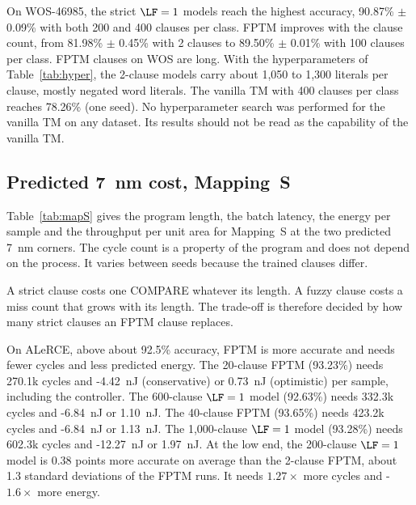 On WOS-46985, the strict $\LF=1$ models reach the highest accuracy, 90.87\% $\pm$ 0.09\% with both 200 and 400 clauses per class.
FPTM improves with the clause count, from 81.98\% $\pm$ 0.45\% with 2 clauses to 89.50\% $\pm$ 0.01\% with 100 clauses per class.
FPTM clauses on WOS are long. With the hyperparameters of Table~\ref{tab:hyper}, the 2-clause models carry about 1,050 to 1,300 literals per clause, mostly negated word literals.
The vanilla TM with 400 clauses per class reaches 78.26\% (one seed).
No hyperparameter search was performed for the vanilla TM on any dataset. Its results should not be read as the capability of the vanilla TM.

\subsection{Predicted 7~nm \gainp{} cost, Mapping~S}
Table~\ref{tab:mapS} gives the program length, the batch latency, the energy per sample and the throughput per unit area for Mapping~S at the two predicted 7~nm corners.
The cycle count is a property of the program and does not depend on the process. It varies between seeds because the trained clauses differ.

\begin{table}
\footnotesize
\setlength{\tabcolsep}{4pt}
\centering
\caption{Mapping~S (sample-stationary) at the predicted 7~nm corners, mean $\pm$ standard deviation over seeds where shown. Rows/col.: CAM rows per logical column. Subarrays: stacked subarrays per logical column. Latency includes refresh. Energy includes dynamic, refresh, gain-cell static and controller energy (M6). It excludes input loading (M4) and model-SRAM leakage (M7). Throughput includes input loading and is given per mm$^2$ of occupied subarrays and model SRAM (M7) of a 256-subarray macro.}
\label{tab:mapS}

\end{table}


A strict clause costs one COMPARE whatever its length.
A fuzzy clause costs a miss count that grows with its length.
The trade-off is therefore decided by how many strict clauses an FPTM clause replaces.

On ALeRCE, above about 92.5\% accuracy, FPTM is more accurate and needs fewer cycles and less predicted energy.
The 20-clause FPTM (93.23\%) needs 270.1k cycles and \hyp{4.42~nJ (conservative) or 0.73~nJ (optimistic)} per sample, including the controller.
The 600-clause $\LF=1$ model (92.63\%) needs 332.3k cycles and \hyp{6.84~nJ or 1.10~nJ}.
The 40-clause FPTM (93.65\%) needs 423.2k cycles and \hyp{6.84~nJ or 1.13~nJ}. The 1,000-clause $\LF=1$ model (93.28\%) needs 602.3k cycles and \hyp{12.27~nJ or 1.97~nJ}.
At the low end, the 200-clause $\LF=1$ model is 0.38 points more accurate on average than the 2-clause FPTM, about 1.3 standard deviations of the FPTM runs. It needs $1.27\times$ more cycles and \hyp{$1.6\times$} more energy.

